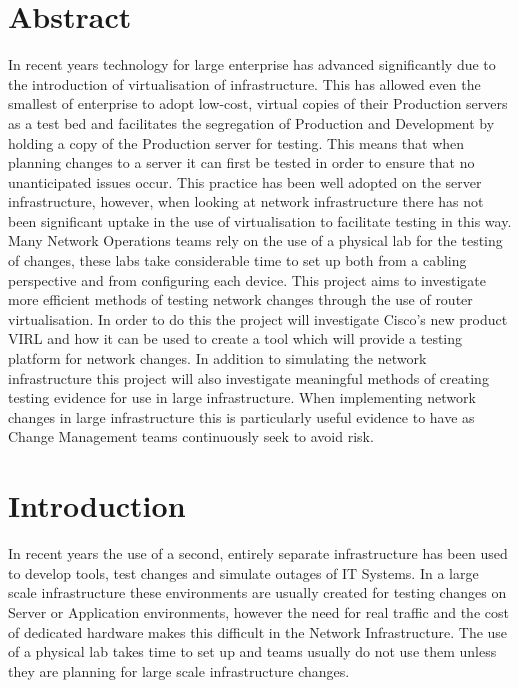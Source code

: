 \documentclass[11pt]{report}
\begin{document}
\chapter*{Abstract}

In recent years technology for large enterprise has advanced significantly due to the introduction of virtualisation of infrastructure. This has allowed even the smallest of enterprise to adopt low-cost, virtual copies of their Production servers as a test bed and facilitates the segregation of Production and Development by holding a copy of the Production server for testing. This means that when planning changes to a server it can first be tested in order to ensure that no unanticipated issues occur. This practice has been well adopted on the server infrastructure, however, when looking at network infrastructure there has not been significant uptake in the use of virtualisation to facilitate testing in this way. Many Network Operations teams rely on the use of a physical lab for the testing of changes, these labs take considerable time to set up both from a cabling perspective and from configuring each device. This project aims to investigate more efficient methods of testing network changes through the use of router virtualisation. In order to do this the project will investigate Cisco's new product VIRL and how it can be used to create a tool which will provide a testing platform for network changes. In addition to simulating the network infrastructure this project will also investigate meaningful methods of creating testing evidence for use in large infrastructure. When implementing network changes in large infrastructure this is particularly useful evidence to have as Change Management teams continuously seek to avoid risk.

\pagebreak

\tableofcontents


\chapter{Introduction}
In recent years the use of a second, entirely separate infrastructure has been used to develop tools, test changes and simulate outages of IT Systems. In a large scale infrastructure these environments are usually created for testing changes on Server or Application environments, however the need for real traffic and the cost of dedicated hardware makes this difficult in the Network Infrastructure. The use of a physical lab takes time to set up and teams usually do not use them unless they are planning for large scale infrastructure changes.
\end{document}
